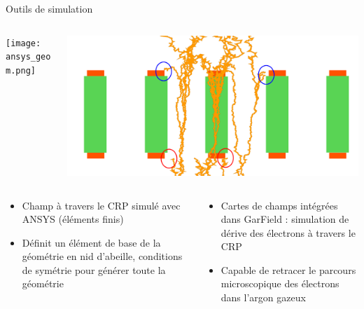     \begin{frame}{Outils de simulation}
        \begin{scriptsize}
            \begin{columns}
                \begin{column}{0.5\textwidth}
                    \texttt{[image: ansys\_geom.png]}
                \end{column}\hfill
                \begin{column}{0.5\textwidth}
                    \includegraphics[width=\textwidth]{./pictures/losses_with_lem.png}
                \end{column}
            \end{columns}
            \begin{columns}
                \begin{column}{0.5\textwidth}
                    \begin{itemize}
                        \item Champ à travers le CRP simulé avec ANSYS (éléments finis)
                        \item Définit un élément de base de la géométrie en nid d'abeille, conditions de symétrie pour générer toute la géométrie
                    \end{itemize}
                \end{column}
                \begin{column}{0.5\textwidth}
                    \begin{itemize}
                        \item Cartes de champs intégrées dans GarField : simulation de dérive des électrons à travers le CRP
                        \item Capable de retracer le parcours microscopique des électrons dans l'argon gazeux
                    \end{itemize}
                \end{column}
            \end{columns}
        \end{scriptsize}
    \end{frame}
    

